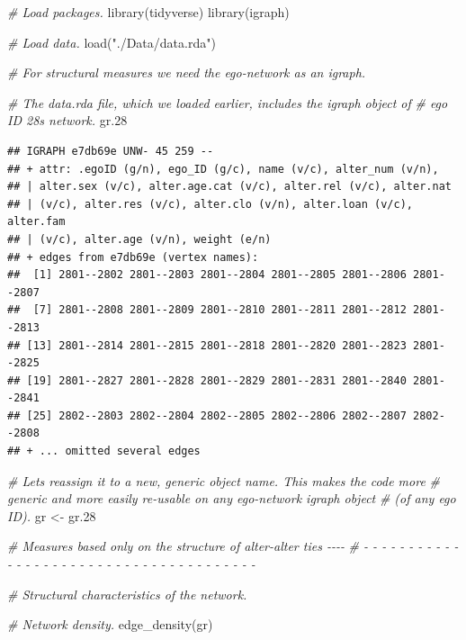 \documentclass[
]{book}
\newenvironment{Shaded}{\begin{snugshade}}{\end{snugshade}}
\newcommand{\CommentTok}[1]{\textcolor[rgb]{0.56,0.35,0.01}{\textit{#1}}}
\newcommand{\FloatTok}[1]{\textcolor[rgb]{0.00,0.00,0.81}{#1}}
\newcommand{\FunctionTok}[1]{\textcolor[rgb]{0.00,0.00,0.00}{#1}}
\newcommand{\NormalTok}[1]{#1}
\newcommand{\OtherTok}[1]{\textcolor[rgb]{0.56,0.35,0.01}{#1}}
\newcommand{\StringTok}[1]{\textcolor[rgb]{0.31,0.60,0.02}{#1}}
\begin{document}
\begin{Shaded}
\begin{Highlighting}[]
\CommentTok{\# Load packages.}
\FunctionTok{library}\NormalTok{(tidyverse)}
\FunctionTok{library}\NormalTok{(igraph)}

\CommentTok{\# Load data.}
\FunctionTok{load}\NormalTok{(}\StringTok{"./Data/data.rda"}\NormalTok{)}

\CommentTok{\# For structural measures we need the ego{-}network as an igraph.}

\CommentTok{\# The data.rda file, which we loaded earlier, includes the igraph object of}
\CommentTok{\# ego ID 28\textquotesingle{}s network.}
\NormalTok{gr}\FloatTok{.28}
\end{Highlighting}
\end{Shaded}

\begin{verbatim}
## IGRAPH e7db69e UNW- 45 259 -- 
## + attr: .egoID (g/n), ego_ID (g/c), name (v/c), alter_num (v/n),
## | alter.sex (v/c), alter.age.cat (v/c), alter.rel (v/c), alter.nat
## | (v/c), alter.res (v/c), alter.clo (v/n), alter.loan (v/c), alter.fam
## | (v/c), alter.age (v/n), weight (e/n)
## + edges from e7db69e (vertex names):
##  [1] 2801--2802 2801--2803 2801--2804 2801--2805 2801--2806 2801--2807
##  [7] 2801--2808 2801--2809 2801--2810 2801--2811 2801--2812 2801--2813
## [13] 2801--2814 2801--2815 2801--2818 2801--2820 2801--2823 2801--2825
## [19] 2801--2827 2801--2828 2801--2829 2801--2831 2801--2840 2801--2841
## [25] 2802--2803 2802--2804 2802--2805 2802--2806 2802--2807 2802--2808
## + ... omitted several edges
\end{verbatim}

\begin{Shaded}
\begin{Highlighting}[]
\CommentTok{\# Let\textquotesingle{}s reassign it to a new, generic object name. This makes the code more }
\CommentTok{\# generic and more easily re{-}usable on any ego{-}network igraph object }
\CommentTok{\# (of any ego ID).}
\NormalTok{gr }\OtherTok{\textless{}{-}}\NormalTok{ gr}\FloatTok{.28}

\CommentTok{\# Measures based only on the structure of alter{-}alter ties                  {-}{-}{-}{-}}
\CommentTok{\# {-} {-} {-} {-} {-} {-} {-} {-} {-} {-} {-} {-} {-} {-} {-} {-} {-} {-} {-} {-} {-} {-} {-} {-} {-} {-} {-} {-} {-} {-} {-} {-} {-} {-} {-} {-} {-} {-} {-} }

\CommentTok{\# Structural characteristics of the network.}

\CommentTok{\# Network density.}
\FunctionTok{edge\_density}\NormalTok{(gr)}
\end{Highlighting}
\end{Shaded}
\end{document}
